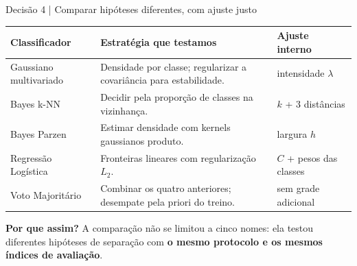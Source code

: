 \documentclass[aspectratio=169,11pt]{beamer}
\begin{document}
\begin{frame}[t]{Decisão 4 | Comparar hipóteses diferentes, com ajuste justo}
\vspace{1mm}
\footnotesize
\renewcommand{\arraystretch}{1.20}
\setlength{\tabcolsep}{4pt}
\begin{tabular}{p{2.3cm}p{5.2cm}p{3.3cm}}
\toprule
\textbf{Classificador} & \textbf{Estratégia que testamos} & \textbf{Ajuste interno}\\
\midrule
Gaussiano multivariado & Densidade por classe; regularizar a covariância para estabilidade. & intensidade $\lambda$\\
Bayes k-NN & Decidir pela proporção de classes na vizinhança. & $k$ + 3 distâncias\\
Bayes Parzen & Estimar densidade com kernels gaussianos produto. & largura $h$\\
Regressão Logística & Fronteiras lineares com regularização $L_2$. & $C$ + pesos das classes\\
Voto Majoritário & Combinar os quatro anteriores; desempate pela priori do treino. & sem grade adicional\\
\bottomrule
\end{tabular}
\vspace{3mm}
\begin{notabox}\small \textbf{Por que assim?} A comparação não se limitou a cinco nomes: ela testou diferentes hipóteses de separação com \textbf{o mesmo protocolo e os mesmos índices de avaliação}.\end{notabox}
\end{frame}
\end{document}

